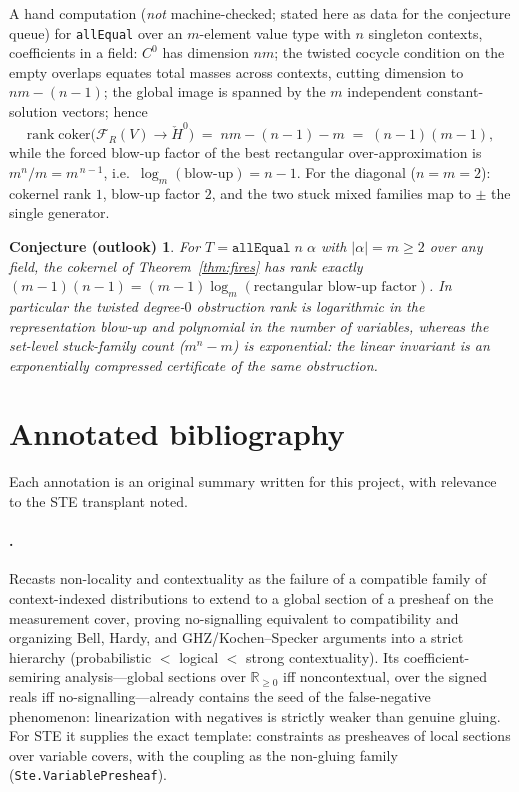 \documentclass[11pt]{article}
\newtheorem*{conjecture}{Conjecture (outlook)}
\newcommand{\lean}[1]{\texttt{#1}}
\newcommand{\Hc}[1]{\check{H}^{#1}}
\newcommand{\FR}{\mathcal{F}_R}
\newcommand{\coker}{\mathrm{coker}}
\newcommand{\R}{\mathbb{R}}
\begin{document}
A hand computation (\emph{not} machine-checked; stated here as data
for the conjecture queue) for \lean{allEqual} over an $m$-element value
type with $n$ singleton contexts, coefficients in a field: $C^0$ has
dimension $nm$; the twisted cocycle condition on the empty overlaps
equates total masses across contexts, cutting dimension to
$nm - (n-1)$; the global image is spanned by the $m$ independent
constant-solution vectors; hence
\[
\mathrm{rank}\; \coker\bigl(\FR(V) \to \Hc{0}\bigr)
 \;=\; nm - (n-1) - m \;=\; (n-1)(m-1),
\]
while the forced blow-up factor of the best rectangular
over-approximation is $m^n / m = m^{\,n-1}$, i.e.\
$\log_m(\text{blow-up}) = n - 1$.  For the diagonal ($n = m = 2$):
cokernel rank $1$, blow-up factor $2$, and the two stuck mixed
families map to $\pm$ the single generator.

\begin{conjecture}
For $T = \lean{allEqual}\;n\;\alpha$ with $|\alpha| = m \geq 2$ over
any field, the cokernel of Theorem~\ref{thm:fires} has rank exactly
$(m-1)(n-1) = (m-1)\log_m(\text{rectangular blow-up factor})$.  In
particular the twisted degree-$0$ obstruction rank is
\emph{logarithmic} in the representation blow-up and \emph{polynomial}
in the number of variables, whereas the set-level stuck-family count
($m^n - m$) is exponential: the linear invariant is an exponentially
compressed certificate of the same obstruction.
\end{conjecture}

\section{Annotated bibliography}
\label{sec:bib}

Each annotation is an original summary written for this project, with
relevance to the STE transplant noted.

\paragraph{\citet{abramsky2011sheaf}.}
Recasts non-locality and contextuality as the failure of a compatible
family of context-indexed distributions to extend to a global section
of a presheaf on the measurement cover, proving no-signalling
equivalent to compatibility and organizing Bell, Hardy, and
GHZ/Kochen--Specker arguments into a strict hierarchy (probabilistic
$<$ logical $<$ strong contextuality).  Its coefficient-semiring
analysis---global sections over $\R_{\geq 0}$ iff noncontextual, over
the signed reals iff no-signalling---already contains the seed of the
false-negative phenomenon: linearization with negatives is strictly
weaker than genuine gluing.  For STE it supplies the exact template:
constraints as presheaves of local sections over variable covers, with
the coupling as the non-gluing family (\lean{Ste.VariablePresheaf}).
\end{document}
